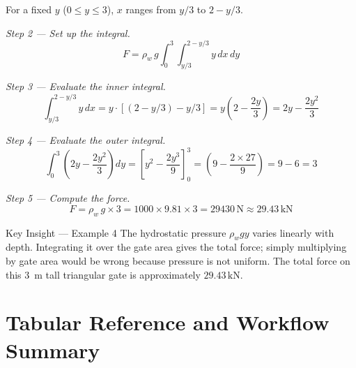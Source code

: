 \documentclass[12pt,a4paper]{article}
\begin{document}
For a fixed \(y\) (\(0 \leq y \leq 3\)), \(x\) ranges from \(y/3\) to \(2 - y/3\).

\textit{Step 2 --- Set up the integral.}
\[
F = \rho_w\,g \int_0^3 \int_{y/3}^{2-y/3} y\,dx\,dy
\]

\textit{Step 3 --- Evaluate the inner integral.}
\[
\int_{y/3}^{2-y/3} y\,dx = y \cdot \left[(2 - y/3) - y/3\right] = y\!\left(2 - \frac{2y}{3}\right) = 2y - \frac{2y^2}{3}
\]

\textit{Step 4 --- Evaluate the outer integral.}
\[
\int_0^3 \left(2y - \frac{2y^2}{3}\right) dy
= \left[y^2 - \frac{2y^3}{9}\right]_0^3
= \left(9 - \frac{2 \times 27}{9}\right)
= 9 - 6 = 3
\]

\textit{Step 5 --- Compute the force.}
\[
F = \rho_w\,g \times 3 = 1000 \times 9.81 \times 3 = 29430\,\text{N} \approx 29.43\,\text{kN}
\]

\begin{learnbox}{Key Insight --- Example 4}
The hydrostatic pressure \(\rho_w g y\) varies linearly with depth. Integrating it over the gate area gives the total force; simply multiplying by gate area would be wrong because pressure is not uniform. The total force on this 3~m tall triangular gate is approximately \(29.43\,\text{kN}\).
\end{learnbox}

\section{Tabular Reference and Workflow Summary}
\end{document}
